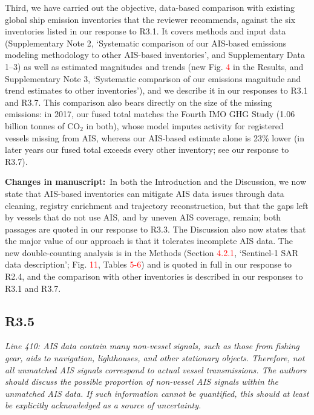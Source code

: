\documentclass[11pt]{article}
\newcommand{\point}[1]{\subsection*{\normalfont\bfseries #1}}
\newcommand{\changes}{\par\medskip\noindent%
  \textbf{\textcolor{changegreen}{Changes in manuscript:}}\ }
\begin{document}
Third, we have carried out the objective, data-based comparison with existing global ship emission inventories that the reviewer recommends, against the six inventories listed in our response to R3.1. It covers methods and input data (Supplementary Note 2, `Systematic comparison of our AIS-based emissions modeling methodology to other AIS-based inventories', and Supplementary Data 1--3) as well as estimated magnitudes and trends (new Fig. \textcolor{red}{4} in the Results, and Supplementary Note 3, `Systematic comparison of our emissions magnitude and trend estimates to other inventories'), and we describe it in our responses to R3.1 and R3.7. This comparison also bears directly on the size of the missing emissions: in 2017, our fused total matches the Fourth IMO GHG Study (1.06 billion tonnes of CO$_{2}$ in both), whose model imputes activity for registered vessels missing from AIS, whereas our AIS-based estimate alone is 23\% lower (in later years our fused total exceeds every other inventory; see our response to R3.7).

\changes In both the Introduction and the Discussion, we now state that AIS-based inventories can mitigate AIS data issues through data cleaning, registry enrichment and trajectory reconstruction, but that the gaps left by vessels that do not use AIS, and by uneven AIS coverage, remain; both passages are quoted in our response to R3.3. The Discussion also now states that the major value of our approach is that it tolerates incomplete AIS data. The new double-counting analysis is in the Methods (Section \textcolor{red}{4.2.1}, `Sentinel-1 SAR data description'; Fig. \textcolor{red}{11}, Tables \textcolor{red}{5-6}) and is quoted in full in our response to R2.4, and the comparison with other inventories is described in our responses to R3.1 and R3.7.

\point{R3.5}

\begin{refquote}\itshape
Line 410: AIS data contain many non-vessel signals, such as those from fishing
gear, aids to navigation, lighthouses, and other stationary objects. Therefore,
not all unmatched AIS signals correspond to actual vessel transmissions. The
authors should discuss the possible proportion of non-vessel AIS signals within
the unmatched AIS data. If such information cannot be quantified, this should at
least be explicitly acknowledged as a source of uncertainty.
\end{refquote}
\end{document}
